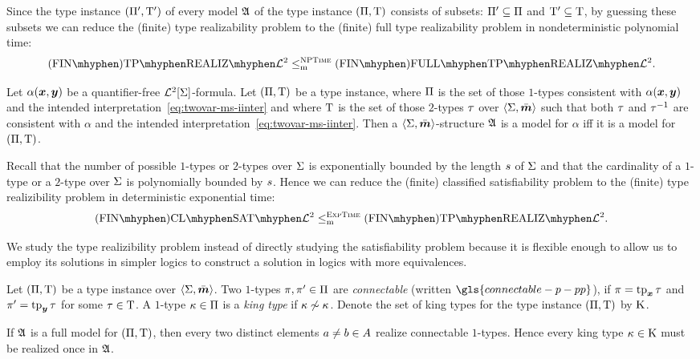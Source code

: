 \begin{remark}\label{rem:red-real-to-full-real}
Since the type instance $(\Pi',\mathrm{T}')$ of every model $\mathfrak{A}$ of the type
instance $(\Pi,\mathrm{T})$ consists of subsets: $\Pi' \subseteq \Pi$ and $\mathrm{T}'
\subseteq \mathrm{T}$, by guessing these subsets we can reduce the (finite) type
realizability problem to the (finite) full type realizability problem in
nondeterministic polynomial time:
\[
  \FinAReal{\vFo2} \red\cNP \FinAFullReal{\vFo2}.
\]
\end{remark}

\begin{remark}\label{rem:red-sat-to-real}
Let $\alpha(\bm{x},\bm{y})$ be a quantifier-free $\mathcal{L}^{2}[\mathrm{\Sigma}]$-formula.
Let $(\Pi,\mathrm{T})$ be a type instance, where $\Pi$ is the set of those
$1$-types consistent with $\alpha(\bm{x},\bm{y})$ and the intended
interpretation~\cref{eq:twovar-ms-iinter} and where $\mathrm{T}$ is the set of
those $2$-types $\tau$ over $\left\langle \mathrm{\Sigma},\bar{\bm{m}} \right\rangle$ such that both $\tau$ and 
$\tau^{-1}$ are consistent with $\alpha$ and the intended interpretation~\cref{eq:twovar-ms-iinter}. Then a $\left\langle \mathrm{\Sigma},\bar{\bm{m}} \right\rangle$-structure
$\mathfrak{A}$ is a model for $\alpha$ iff it is a model for $(\Pi,\mathrm{T})$.

Recall that the number of possible $1$-types or $2$-types over $\mathrm{\Sigma}$ is
exponentially bounded by the length $s$ of $\mathrm{\Sigma}$ and that the cardinality
of a $1$-type or a $2$-type over $\mathrm{\Sigma}$ is polynomially bounded by $s$.
Hence we can reduce the (finite) classified satisfiability problem to the
(finite) type realizibility problem in deterministic exponential time:
\[
  \FinAClSat{\vFo2} \red\cExpTime \FinAReal{\vFo2}.
\]
\end{remark}

We study the type realizibility problem instead of directly studying the
satisfiability problem because it is flexible enough to allow us to employ its
solutions in simpler logics to construct a solution in logics with more
equivalences.
\begin{definition}\label{def:connectable}
Let $(\Pi,\mathrm{T})$ be a type instance over $\left\langle \mathrm{\Sigma},\bar{\bm{m}} \right\rangle$.
Two $1$-types $\pi, {\pi'} \in \Pi$ are \emph{connectable} (written
$\gls{connectable-p-pp}$), if $\pi = \operatorname{tp}_{\bm{x}}\tau$ and ${\pi'} = \operatorname{tp}_{\bm{y}}\tau$ for some $\tau \in \mathrm{T}$. A $1$-type $\kappa \in \Pi$ is a \emph{king type} if
$\kappa \not\sim \kappa$. Denote the set of king types for the type instance
$(\Pi,\mathrm{T})$ by $\mathrm{K}$.
\end{definition}
\begin{remark}\label{rem:twovar-king-once}
If $\mathfrak{A}$ is a full model for $(\Pi,\mathrm{T})$, then every two distinct elements
$a \neq b \in A$ realize connectable $1$-types. Hence every king type
$\kappa \in \mathrm{K}$ must be realized once in $\mathfrak{A}$.
\end{remark}


